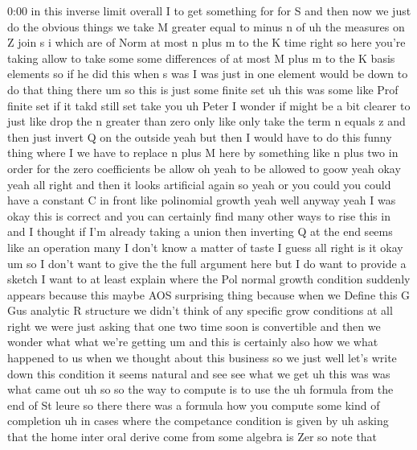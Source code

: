 \begin{unfinished}{0:00}
in  this  inverse  limit
overall  I  to  get  something  for  for
S  and  then  now  we  just  do  the  obvious
things  we  take  M  greater  equal  to  minus
n  of  uh  the  measures  on  Z  join  s  i  which
are  of  Norm  at  most  n  plus  m  to  the
K
time  right  so  here  you're  taking  allow
to  take  some  some  differences  of  at  most
M  plus  m  to  the  K  basis
elements  so  if  he  did  this  when  s  was  I
was  just  in  one  element  would  be  down  to
do  that  thing  there  um  so  this  is  just
some  finite  set  uh  this  was  some  like
Prof  finite  set  if  it  takd  still  set
take
you  uh  Peter  I  wonder  if  might  be  a  bit
clearer  to  just  like  drop  the  n  greater
than  zero  only  like  only  take  the  term  n
equals  z  and  then  just  invert  Q  on  the
outside  yeah  but  then  I  would  have  to  do
this  funny  thing  where  I  we  have  to
replace  n  plus  M  here  by  something  like
n  plus  two  in  order  for  the  zero
coefficients  be  allow  oh  yeah  to  be
allowed  to  goow  yeah  okay  yeah  all  right
and  then  it  looks  artificial  again  so
yeah  or  you  could  you  could  have  a
constant  C  in  front  like  polinomial
growth  yeah  well
anyway  yeah  I
was  okay  this  is  correct  and  you  can
certainly  find  many  other  ways  to  rise
this
in  and  I  thought  if  I'm  already  taking  a
union  then  inverting  Q  at  the
end  seems  like  an
operation  many  I  don't
know
a  matter  of  taste  I
guess  all
right  is  it  okay
um  so  I  don't  want  to  give  the  the  full
argument  here  but  I  do  want  to  provide  a
sketch  I  want  to  at  least  explain  where
the  Pol  normal  growth  condition  suddenly
appears  because  this  maybe  AOS
surprising  thing  because  when  we  Define
this  G  Gus  analytic  R
structure  we  didn't  think  of  any
specific  grow  conditions  at  all  right  we
were  just  asking  that  one  two  time  soon
is  convertible  and  then  we  wonder  what
what  we're  getting
um  and  this  is  certainly  also  how  we
what  happened  to  us  when  we  thought
about  this  business  so  we  just  well
let's  write  down  this  condition  it  seems
natural  and  see  see  what  we  get  uh  this
was  was  what  came
out  uh  so  so  the  way  to  compute  is  to
use  the
uh  formula  from  the  end  of  St
leure  so  there  there  was  a  formula  how
you  compute  some  kind  of  completion  uh
in  cases  where  the  competance  condition
is  given  by  uh  asking  that  the  home
inter  oral  derive  come  from  some  algebra
is  Zer  so
note  that

\end{unfinished}
